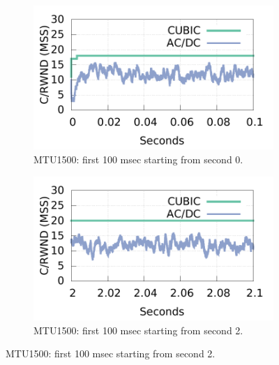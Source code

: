 \begin{figure}[!htb]
        \centering
        \begin{subfigure}[b]{0.225\textwidth}
                \centering
                \includegraphics[width=\textwidth]{figures/cwnd_rwnd2/mtu1500_cubic/cubic_measure_cwnd_rwnd_gap_15k_5flows_0sec_100msec.pdf}
                \caption{MTU1500: first 100 msec starting from second 0.}
                \label{who_limits_cwnd_rwnd_1500_0sec}
        \end{subfigure}
        \begin{subfigure}[b]{0.225\textwidth}
                \centering
                \includegraphics[width=\textwidth]{figures/cwnd_rwnd2/mtu1500_cubic/cubic_measure_cwnd_rwnd_gap_15k_5flows_2sec_100msec.pdf}
                \caption{MTU1500: first 100 msec starting from second 2.}
                \label{who_limits_cwnd_rwnd_1500_2sec}
        \end{subfigure}


\end{figure}

